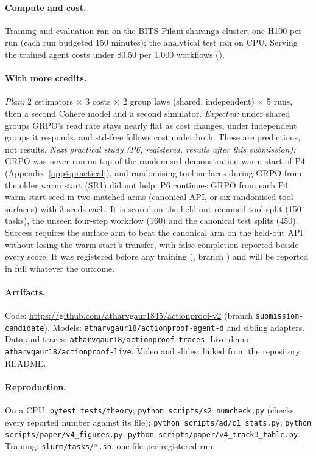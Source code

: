 {\paragraph{Compute and cost.} Training and evaluation ran on the BITS Pilani sharanga cluster, one H100 per run (each
run budgeted 150 minutes); the analytical test ran on CPU. Serving the trained agent costs under \$0.50 per 1{,}000
workflows ().

\paragraph{With more credits.} \emph{Plan:} 2 estimators $\times$ 3 costs $\times$ 2 group laws (shared, independent)
$\times$ 5 runs, then a second Cohere model and a second simulator. \emph{Expected:} under shared groups GRPO's read
rate stays nearly flat as cost changes, under independent groups it responds, and std-free follows cost under both.
These are predictions, not results. \emph{Next practical study (P6, registered, results after this submission):} GRPO was never run on top of the
randomised-demonstration warm start of P4 (Appendix~\ref{app4:practical}), and randomising tool surfaces during GRPO from
the older warm start (SR1) did not help. P6 continues GRPO from each P4 warm-start seed in two matched arms (canonical
API, or six randomised tool surfaces) with 3 seeds each. It is scored on the held-out renamed-tool split (150 tasks), the
unseen four-step workflow (160) and the canonical test splits (450). Success requires the surface arm to beat the
canonical arm on the held-out API without losing the warm start's transfer, with false completion reported beside every
score. It was registered before any training (, branch
) and will be reported in full whatever the outcome.

\paragraph{Artifacts.} Code: \url{https://github.com/atharvgaur1845/actionproof-v2} (branch
\texttt{submission-candidate}). Models: \texttt{atharvgaur18/actionproof-agent-d} and sibling adapters. Data and traces:
\texttt{atharvgaur18/actionproof-traces}. Live demo: \texttt{atharvgaur18/actionproof-live}. Video and slides: linked
from the repository README.

\paragraph{Reproduction.} On a CPU: \texttt{pytest tests/theory}; \texttt{python scripts/s2\_numcheck.py} (checks every
reported number against its file); \texttt{python scripts/ad/c1\_stats.py}; \texttt{python scripts/paper/v4\_figures.py};
\texttt{python scripts/paper/v4\_track3\_table.py}. Training: \texttt{slurm/tasks/*.sh}, one file per registered run.

}
